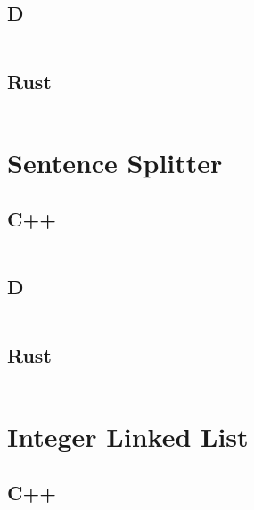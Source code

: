 \documentclass[finalcopy]{srpaper}
\begin{document}
\subsection{D}
\begin{mdframed}[linecolor=black]
\inputminted{d}{../examples/hello-world/hello_world.d}
\end{mdframed}

\subsection{Rust}
\begin{mdframed}[linecolor=black]
\inputminted{rust}{../examples/hello-world/hello_world.rs}
\end{mdframed}

\section{Sentence Splitter}
\subsection{C++}
\begin{mdframed}[linecolor=black]
\inputminted[fontsize=\scriptsize]{cpp}{../examples/sentence-splitter/sentence_splitter.cpp}
\end{mdframed}

\subsection{D}
\begin{mdframed}[linecolor=black]
\inputminted[fontsize=\scriptsize]{d}{../examples/sentence-splitter/sentence_splitter.d}
\end{mdframed}

\subsection{Rust}
\begin{mdframed}[linecolor=black]
\inputminted[fontsize=\scriptsize]{rust}{../examples/sentence-splitter/sentence_splitter.rs}
\end{mdframed}

\section{Integer Linked List}
\subsection{C++}
\begin{mdframed}[linecolor=black]
\inputminted[fontsize=\scriptsize]{cpp}{../examples/int-linked-list/int_linked_list.hpp}
\end{mdframed}
\end{document}
